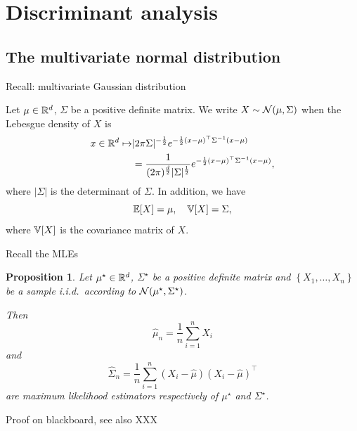 \documentclass[xcolor={usenames,dvipsnames},handout]{beamer}
\newtheorem{prop}[theorem]{Proposition}
\begin{document}
\section{Discriminant analysis}


\subsection{The multivariate normal distribution}

\begin{frame}{Recall: multivariate Gaussian distribution}
	\begin{definition}
		Let $\mu \in \mathbb{R}^d$, $\Sigma$ be a positive definite matrix.
		We write $X \sim {\mathcal{N}}(\mu, \Sigma)$ when the Lebesgue density of $X$ is
	\begin{align*}
			x \in \mathbb{R}^d \mapsto  & |2\pi\Sigma|^{-\frac 12} e^{- \frac 12 (x-\mu)^\top \Sigma^{-1} (x-\mu)} \\
			&= \frac{1}{(2\pi)^{\frac d2} |\Sigma|^{\frac 12}} e^{- \frac 12 (x-\mu)^\top \Sigma^{-1} (x-\mu)},
	\end{align*}
		where $|\Sigma|$ is the determinant of $\Sigma$.
		In addition, we have
		$$
			\mathbb{E} [X] = \mu,
			\quad
			\mathbb{V}[X] = \Sigma,
		$$
		where $\mathbb{V}[X]$ is the covariance matrix of $X$.
	\end{definition}
	
\end{frame}

\begin{frame}{Recall the MLEs}


	\begin{prop}
		Let $\mu^\star \in \mathbb{R}^d$, $\Sigma^\star$ be a positive definite matrix and $\left\{X_1, \dots, X_{n} \right\}$ be a sample i.i.d.\ according to ${\mathcal{N}}(\mu^\star, \Sigma^\star)$.

		Then
		$$
			\hat \mu_n = \frac{1}{n} \sum_{i=1}^{n} X_i
		$$
		and
		$$
			\hat \Sigma_n = \frac{1}{n} \sum_{i=1}^{n} (X_i - \hat \mu)(X_i - \hat \mu)^\top
		$$
		are maximum likelihood estimators respectively of $\mu^\star$ and $\Sigma^\star$.
	\end{prop}

\centering
{\color{Vert} Proof on blackboard, see also XXX}
	
\end{frame}
\end{document}
